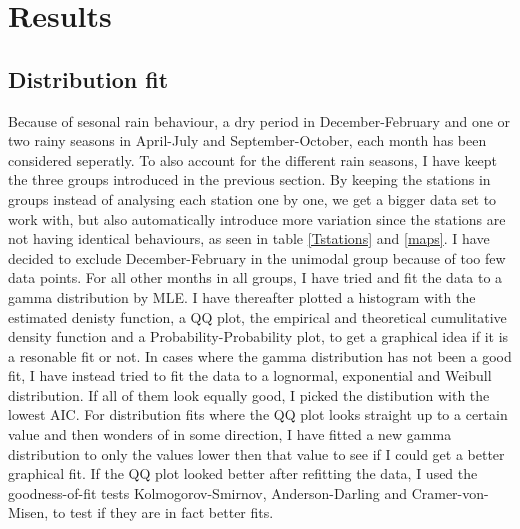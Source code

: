 \documentclass{article}
\begin{document}
	\section{Results}
	\subsection{Distribution fit}
	Because of sesonal rain behaviour, a dry period in December-February and one or two rainy seasons in April-July and September-October, each month has been considered seperatly. To also account for the different rain seasons, I have keept the three groups introduced in the previous section. By keeping the stations in groups instead of analysing each station one by one, we get a bigger data set to work with, but also automatically introduce more variation since the stations are not having identical behaviours, as seen in table \ref{Tstations} and \ref{maps}. I have decided to exclude December-February in the unimodal group because of too few data points. For all other months in all groups, I have tried and fit the data to a gamma distribution by MLE. I have thereafter plotted a histogram with the estimated denisty function, a QQ plot, the empirical and theoretical cumulitative density function and a Probability-Probability plot, to get a graphical idea if it is a resonable fit or not. In cases where the gamma distribution has not been a good fit, I have instead tried to fit the data to a lognormal, exponential and Weibull distribution. If all of them look equally good, I picked the distibution with the lowest AIC. For distribution fits where the QQ plot looks straight up to a certain value and then wonders of in some direction, I have fitted a new gamma distribution to only the values lower then that value to see if I could get a better graphical fit. If the QQ plot looked better after refitting the data, I used the goodness-of-fit tests Kolmogorov-Smirnov, Anderson-Darling and Cramer-von-Misen, to test if they are in fact better fits. 
\end{document}
